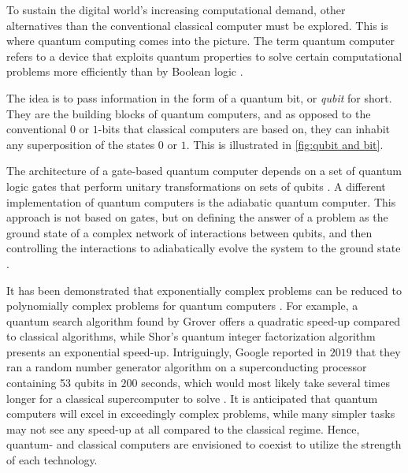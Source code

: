 To sustain the digital world's increasing computational demand, other alternatives than the conventional classical computer must be explored. This is where quantum computing comes into the picture. The term quantum computer refers to a device that exploits quantum properties to solve certain computational problems more efficiently than by Boolean logic \cite{Weber2010}.

The idea is to pass information in the form of a quantum bit, or \textit{qubit} for short. They are the building blocks of quantum computers, and as opposed to the conventional $0$ or $1$-bits that classical computers are based on, they can inhabit any superposition of the states $0$ or $1$. This is illustrated in \autoref{fig:qubit and bit}.


The architecture of a gate-based quantum computer depends on a set of quantum logic gates that perform unitary transformations on sets of qubits \cite{DiVincenzo2000, Ladd2010}. A different implementation of quantum computers is the adiabatic quantum computer. This approach is not based on gates, but on defining the answer of a problem as the ground state of a complex network of interactions between qubits, and then controlling the interactions to adiabatically evolve the system to the ground state \cite{Mizel2007}.



It has been demonstrated that exponentially complex problems can be reduced to polynomially complex problems for quantum computers \cite{Pavicic2006}. For example, a quantum search algorithm found by Grover \cite{Grover1997} offers a quadratic speed-up compared to classical algorithms, while Shor's quantum integer factorization algorithm \cite{Shor1994} presents an exponential speed-up. Intriguingly, Google reported in $2019$ that they ran a random number generator algorithm on a superconducting processor containing 53 qubits in $200$ seconds, which would most likely take several times longer for a classical supercomputer to solve \cite{Martinis2019}. It is anticipated that quantum computers will excel in exceedingly complex problems, while many simpler tasks may not see any speed-up at all compared to the classical regime. Hence, quantum- and classical computers are envisioned to coexist to utilize the strength of each technology.

